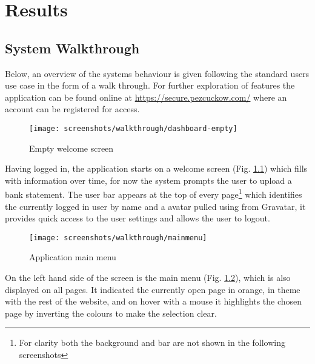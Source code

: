 \begin{comment}
Chapter 5: Results
Results that illustrate how the system designed by you works in practice, and how it is intended to be used, may be presented in this chapter. Screen shots may be useful to illustrate how the software interacts with the user.
\end{comment}

\chapter[Results]{Results}
\label{cha:results}

\section{System Walkthrough}
Below, an overview of the systems behaviour is given following the standard users use case in the form of a walk through. For further exploration of features the application can be found online at \url{https://secure.pezcuckow.com/} where an account can be registered for access.

\begin{figure}
\centering
\texttt{[image: screenshots/walkthrough/dashboard-empty]}
\caption{Empty welcome screen}
\label{fig:welcomescreen}
\end{figure}

Having logged in, the application starts on a welcome screen (Fig. \ref{fig:welcomescreen}) which fills with information over time, for now the system prompts the user to upload a bank statement. The user bar appears at the top of every page\footnote{For clarity both the background and bar are not shown in the following screenshots} which identifies the currently logged in user by name and a avatar pulled using from Gravatar\parencite{gravatar2014avatars}, it provides quick access to the user settings and allows the user to logout.

\begin{figure}
\centering
\texttt{[image: screenshots/walkthrough/mainmenu]}
\caption{Application main menu}
\label{fig:mainmenu}
\end{figure}

On the left hand side of the screen is the main menu (Fig. \ref{fig:mainmenu}), which is also displayed on all pages. It indicated the currently open page in orange, in theme with the rest of the website, and on hover with a mouse it highlights the chosen page by inverting the colours to make the selection clear.

